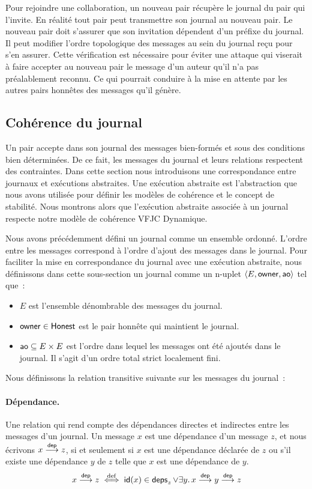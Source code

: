 Pour rejoindre une collaboration, un nouveau pair récupère le journal du pair qui l'invite.
En réalité tout pair peut transmettre son journal au nouveau pair.
Le nouveau pair doit s'assurer que son invitation dépendent d'un préfixe du journal.
Il peut modifier l'ordre topologique des messages au sein du journal reçu pour s'en assurer.
Cette vérification est nécessaire pour éviter une attaque qui viserait à faire accepter au nouveau pair le message d'un auteur qu'il n'a pas préalablement reconnu.
Ce qui pourrait conduire à la mise en attente par les autres pairs honnêtes des messages qu'il génère.


\subsection{Cohérence du journal}

Un pair accepte dans son journal des messages bien-formés et sous des conditions bien déterminées.
De ce fait, les messages du journal et leurs relations respectent des contraintes.
Dans cette section nous introduisons une correspondance entre journaux et exécutions abstraites.
Une exécution abstraite est l'abstraction que nous avons utilisée pour définir les modèles de cohérence et le concept de stabilité.
Nous montrons alors que l'exécution abstraite associée à un journal respecte notre modèle de cohérence \acl{VFJC} Dynamique.

Nous avons précédemment défini un journal comme un ensemble ordonné.
L'ordre entre les messages correspond à l'ordre d'ajout des messages dans le journal.
Pour faciliter la mise en correspondance du journal avec une exécution abstraite, nous définissons dans cette sous-section un journal comme un n-uplet $\tuple*{E, \trm{owner}, \trm{ao}}$ tel que~:
\begin{itemize}
    \item $E$ est l'ensemble dénombrable des messages du journal.
    \item $\trm{owner} \in \trm{Honest}$ est le pair honnête qui maintient le journal.
    \item $\trm{ao} \subseteq E \times E$ est l'ordre dans lequel les messages ont été ajoutés dans le journal.
    Il s'agit d'un ordre total strict localement fini.
\end{itemize}

Nous définissons la relation transitive suivante sur les messages du journal~:

\paragraph{Dépendance.} Une relation qui rend compte des dépendances directes et indirectes entre les messages d'un journal.
Un message $x$ est une dépendance d'un message $z$, et nous écrivons $x \dep z$, si et seulement si $x$ est une dépendance déclarée de $z$ ou s'il existe une dépendance $y$ de $z$ telle que $x$ est une dépendance de $y$.
\begin{equation*}
    x \dep z \defiff \trm{id}(x) \in \trm{deps}_z \lor \exists y \qsep x \dep y \dep z
\end{equation*}

